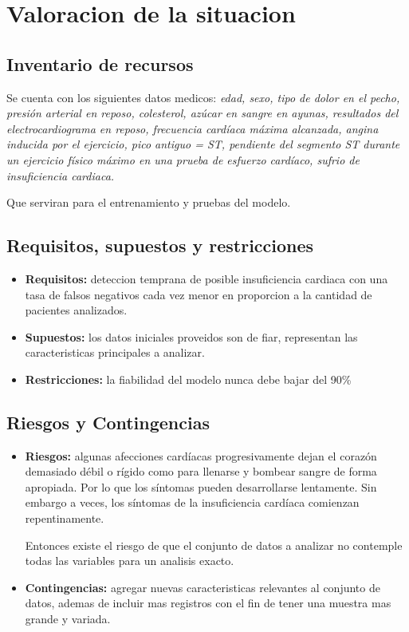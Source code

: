 \documentclass[12pt, letterpaper, spanish]{article}
\begin{document}
\section{Valoracion de la situacion}
\subsection{Inventario de recursos}
Se cuenta con los siguientes datos medicos: \emph{edad, sexo, tipo de dolor en el pecho, 
presión arterial en reposo, colesterol, azúcar en sangre en ayunas, 
resultados del electrocardiograma en reposo, frecuencia cardíaca máxima alcanzada, 
angina inducida por el ejercicio, pico antiguo = ST, 
pendiente del segmento ST durante un ejercicio físico máximo en una prueba de esfuerzo cardíaco, 
sufrio de insuficiencia cardiaca.}

Que serviran para el entrenamiento y pruebas del modelo.
\subsection{Requisitos, supuestos y restricciones}
\begin{itemize}
  \item{\textbf{Requisitos: }deteccion temprana de posible insuficiencia cardiaca
  con una tasa de falsos negativos cada vez menor en proporcion a la
  cantidad de pacientes analizados.} 
  \item{\textbf{Supuestos: }los datos iniciales proveidos son de fiar, representan
  las caracteristicas principales a analizar.}
  \item{\textbf{Restricciones: }la fiabilidad del modelo nunca debe bajar del 90\%}
\end{itemize}
\subsection{Riesgos y Contingencias}
\begin{itemize}
  \item{\textbf{Riesgos: }algunas afecciones cardíacas progresivamente dejan 
  el corazón demasiado débil o rígido como para llenarse y bombear sangre de forma apropiada. 
  Por lo que los síntomas pueden desarrollarse lentamente. Sin embargo a veces, 
  los síntomas de la insuficiencia cardíaca comienzan repentinamente.
  
  Entonces existe el riesgo de que el conjunto de datos a analizar no contemple todas
  las variables para un analisis exacto.} 
  \item{\textbf{Contingencias: }agregar nuevas caracteristicas relevantes al conjunto de datos,
  ademas de incluir mas registros con el fin de tener una muestra mas grande y variada.}
\end{itemize}
\end{document}
